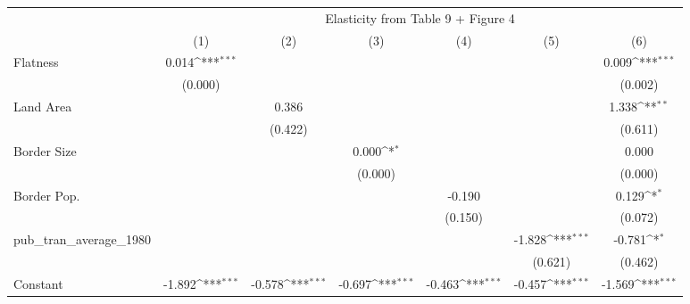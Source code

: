 {
\def\sym#1{\ifmmode^{#1}\else\(^{#1}\)\fi}
\begin{tabular}{l*{6}{c}}
\hline\hline
            &\multicolumn{6}{c}{Elasticity from Table 9 + Figure 4}                                                                             \\
            &\multicolumn{1}{c}{(1)}         &\multicolumn{1}{c}{(2)}         &\multicolumn{1}{c}{(3)}         &\multicolumn{1}{c}{(4)}         &\multicolumn{1}{c}{(5)}         &\multicolumn{1}{c}{(6)}         \\
\hline
Flatness    &       0.014\sym{***}&                     &                     &                     &                     &       0.009\sym{***}\\
            &     (0.000)         &                     &                     &                     &                     &     (0.002)         \\
[1em]
Land Area   &                     &       0.386         &                     &                     &                     &       1.338\sym{**} \\
            &                     &     (0.422)         &                     &                     &                     &     (0.611)         \\
[1em]
Border Size &                     &                     &       0.000\sym{*}  &                     &                     &       0.000         \\
            &                     &                     &     (0.000)         &                     &                     &     (0.000)         \\
[1em]
Border Pop. &                     &                     &                     &      -0.190         &                     &       0.129\sym{*}  \\
            &                     &                     &                     &     (0.150)         &                     &     (0.072)         \\
[1em]
pub\_tran\_average\_1980&                     &                     &                     &                     &      -1.828\sym{***}&      -0.781\sym{*}  \\
            &                     &                     &                     &                     &     (0.621)         &     (0.462)         \\
[1em]
Constant    &      -1.892\sym{***}&      -0.578\sym{***}&      -0.697\sym{***}&      -0.463\sym{***}&      -0.457\sym{***}&      -1.569\sym{***}\\

\end{tabular}}
